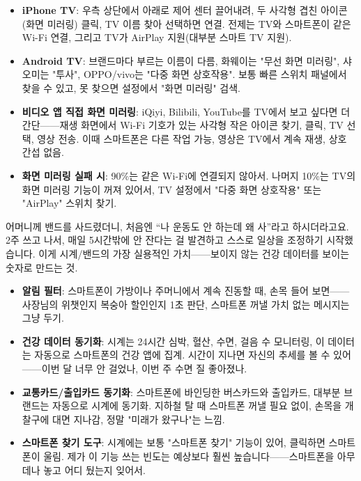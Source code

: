 \begin{itemize}
  \item \textbf{iPhone TV}: 우측 상단에서 아래로 제어 센터 끌어내려, 두 사각형 겹친 아이콘(화면 미러링) 클릭, TV 이름 찾아 선택하면 연결. 전제는 TV와 스마트폰이 같은 Wi-Fi 연결, 그리고 TV가 AirPlay 지원(대부분 스마트 TV 지원).
  \item \textbf{Android TV}: 브랜드마다 부르는 이름이 다름, 화웨이는 "무선 화면 미러링", 샤오미는 "투사", OPPO/vivo는 "다중 화면 상호작용". 보통 빠른 스위치 패널에서 찾을 수 있고, 못 찾으면 설정에서 "화면 미러링" 검색.
  \item \textbf{비디오 앱 직접 화면 미러링}: iQiyi, Bilibili, YouTube를 TV에서 보고 싶다면 더 간단——재생 화면에서 Wi-Fi 기호가 있는 사각형 작은 아이콘 찾기, 클릭, TV 선택, 영상 전송. 이때 스마트폰은 다른 작업 가능, 영상은 TV에서 계속 재생, 상호 간섭 없음.
  \item \textbf{화면 미러링 실패 시}: 90\%는 같은 Wi-Fi에 연결되지 않아서. 나머지 10\%는 TV의 화면 미러링 기능이 꺼져 있어서, TV 설정에서 "다중 화면 상호작용" 또는 "AirPlay" 스위치 찾기.
\end{itemize}


어머니께 밴드를 사드렸더니, 처음엔 “나 운동도 안 하는데 왜 사”라고 하시더라고요. 2주 쓰고 나서, 매일 5시간밖에 안 잔다는 걸 발견하고 스스로 일상을 조정하기 시작했습니다. 이게 시계/밴드의 가장 실용적인 가치——보이지 않는 건강 데이터를 보이는 숫자로 만드는 것.

\begin{itemize}
  \item \textbf{알림 필터}: 스마트폰이 가방이나 주머니에서 계속 진동할 때, 손목 들어 보면——사장님의 위챗인지 복숭아 할인인지 1초 판단, 스마트폰 꺼낼 가치 없는 메시지는 그냥 두기.
  \item \textbf{건강 데이터 동기화}: 시계는 24시간 심박, 혈산, 수면, 걸음 수 모니터링, 이 데이터는 자동으로 스마트폰의 건강 앱에 집계. 시간이 지나면 자신의 추세를 볼 수 있어——이번 달 너무 안 걸었나, 이번 주 수면 질 좋아졌나.
  \item \textbf{교통카드/출입카드 동기화}: 스마트폰에 바인딩한 버스카드와 출입카드, 대부분 브랜드는 자동으로 시계에 동기화. 지하철 탈 때 스마트폰 꺼낼 필요 없이, 손목을 개찰구에 대면 지나감, 정말 "미래가 왔구나"는 느낌.
  \item \textbf{스마트폰 찾기 도구}: 시계에는 보통 "스마트폰 찾기" 기능이 있어, 클릭하면 스마트폰이 울림. 제가 이 기능 쓰는 빈도는 예상보다 훨씬 높습니다——스마트폰을 아무 데나 놓고 어디 뒀는지 잊어서.
\end{itemize}

